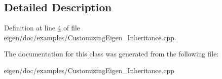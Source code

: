 \subsection{Detailed Description}


Definition at line \hyperlink{eigen_2doc_2examples_2_customizing_eigen___inheritance_8cpp_source_l00004}{4} of file \hyperlink{eigen_2doc_2examples_2_customizing_eigen___inheritance_8cpp_source}{eigen/doc/examples/\+Customizing\+Eigen\+\_\+\+Inheritance.\+cpp}.



The documentation for this class was generated from the following file\+:\begin{DoxyCompactItemize}
\item 
eigen/doc/examples/\+Customizing\+Eigen\+\_\+\+Inheritance.\+cpp\end{DoxyCompactItemize}
